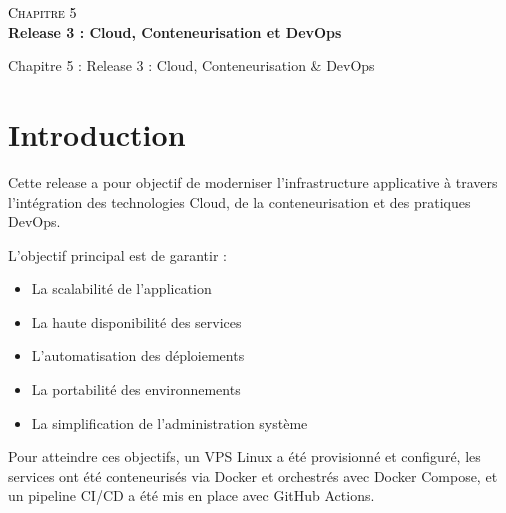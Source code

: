 \setcounter{chapter}{5} %
\setcounter{section}{0}
\setcounter{figure}{0}
\setcounter{table}{0}


\thispagestyle{empty}

\begin{center}
    \vspace*{\fill}

    {\fontsize{40pt}{48pt}\selectfont
    \textcolor{black}{\textsc{Chapitre 5}}}\\[2em]

    {\fontsize{22pt}{26pt}\selectfont
    \textbf{Release 3 : Cloud, Conteneurisation et DevOps}}

    \vspace*{\fill}
\end{center}

\newpage

{Chapitre 5 : Release 3 : Cloud, Conteneurisation \& DevOps}


\section{Introduction}

Cette release a pour objectif de moderniser l’infrastructure applicative à travers l’intégration des technologies Cloud, de la conteneurisation et des pratiques DevOps.

L’objectif principal est de garantir :

\begin{itemize}[label=--]
    \item La scalabilité de l’application 
    \item La haute disponibilité des services 
    \item L’automatisation des déploiements 
    \item La portabilité des environnements 
    \item La simplification de l’administration système
\end{itemize}

Pour atteindre ces objectifs, un VPS Linux a été provisionné et configuré, les services ont été conteneurisés via Docker et orchestrés avec Docker Compose, et un pipeline CI/CD a été mis en place avec GitHub Actions.

